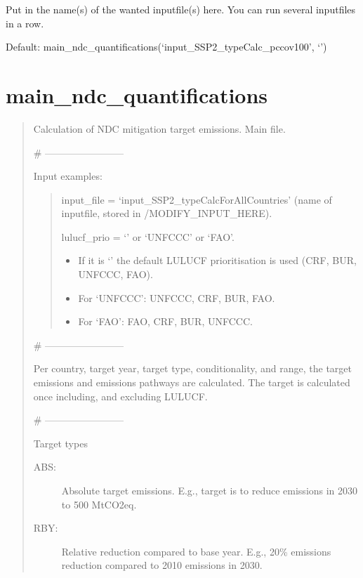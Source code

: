\documentclass[letterpaper,10pt,english]{sphinxmanual}
\begin{document}
Put in the name(s) of the wanted input\sphinxhyphen{}file(s) here. You can run several input\sphinxhyphen{}files in a row.

Default:
main\_ndc\_quantifications(‘input\_SSP2\_typeCalc\_pccov100’, ‘’)


\chapter{main\_ndc\_quantifications}
\label{\detokenize{code:main-ndc-quantifications}}
\begin{quote}

Calculation of NDC mitigation target emissions. Main file.

\# ————————\sphinxhyphen{}

Input examples:
\begin{quote}

input\_file = ‘input\_SSP2\_typeCalcForAllCountries’ (name of input\sphinxhyphen{}file, stored in /MODIFY\_INPUT\_HERE).

lulucf\_prio = ‘’ or ‘UNFCCC’ or ‘FAO’.
\begin{itemize}
\item {} 
If it is ‘’ the default LULUCF prioritisation is used (CRF, BUR, UNFCCC, FAO).

\item {} 
For ‘UNFCCC’: UNFCCC, CRF, BUR, FAO.

\item {} 
For ‘FAO’: FAO, CRF, BUR, UNFCCC.

\end{itemize}
\end{quote}

\# ————————\sphinxhyphen{}

Per country, target year, target type, conditionality, and range, the target emissions and emissions pathways are calculated.
The target is calculated once including, and excluding LULUCF.

\# ————————\sphinxhyphen{}

Target types
\begin{description}
\item[{ABS:}] \leavevmode
Absolute target emissions.
E.g., target is to reduce emissions in 2030 to 500 MtCO2eq.

\item[{RBY:}] \leavevmode
Relative reduction compared to base year.
E.g., 20\% emissions reduction compared to 2010 emissions in 2030.


\end{description}
\end{quote}
\end{document}
